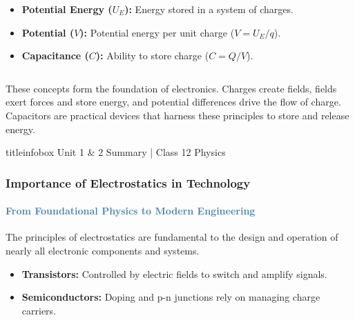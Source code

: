 \begin{frame}
\begin{frame}
\begin{columns}[T]
    \begin{keybox}
    \vspace{0.1cm}
    \begin{itemize}
        \item \textbf{Potential Energy ($U_E$):} Energy stored in a system of charges.
        \item \textbf{Potential ($V$):} Potential energy per unit charge ($V=U_E/q$).
        \item \textbf{Capacitance ($C$):} Ability to store charge ($C=Q/V$).
    \end{itemize}
    \end{keybox}
\end{columns}

\vspace{0.3cm}

\begin{importantbox}
\vspace{0.1cm}
These concepts form the foundation of electronics. Charges create fields, fields exert forces and store energy, and potential differences drive the flow of charge. Capacitors are practical devices that harness these principles to store and release energy.
\vspace{0.1cm}
\end{importantbox}

\vfill

\begin{beamercolorbox}[wd=\textwidth,ht=0.5cm,dp=0.1cm,center]{titleinfobox}
    \small\color{coolgray} Unit 1 & 2 Summary | Class 12 Physics
\end{beamercolorbox}
\end{frame}

\begin{frame}
\frametitle{\textsf{\textbf{Importance of Electrostatics in Technology}}}
\framesubtitle{\textcolor{steelblue}{From Foundational Physics to Modern Engineering}}

\begin{keybox}
\vspace{0.1cm}
The principles of electrostatics are fundamental to the design and operation of nearly all electronic components and systems.
\begin{itemize}
    \item \textbf{Transistors:} Controlled by electric fields to switch and amplify signals.
    \item \textbf{Semiconductors:} Doping and p-n junctions rely on managing charge carriers.
\end{itemize}
\vspace{0.1cm}
\end{keybox}


\end{frame}
\end{frame}
